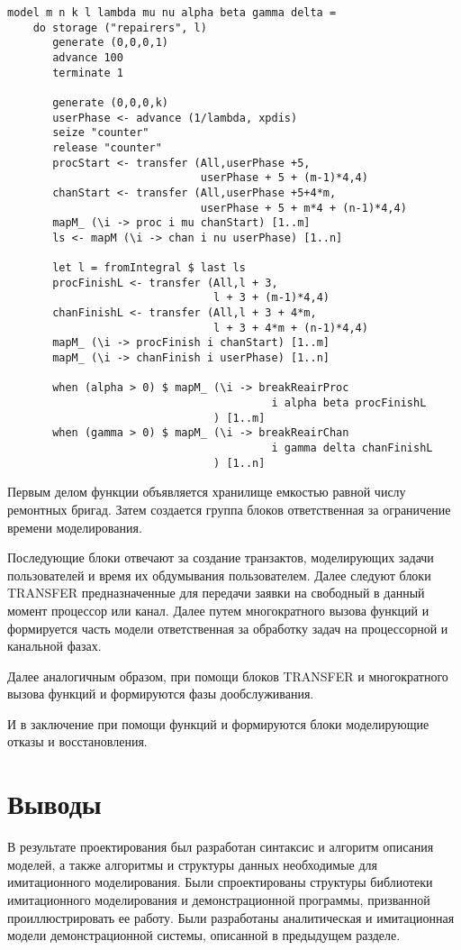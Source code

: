 \begin{verbatim}
model m n k l lambda mu nu alpha beta gamma delta = 
    do storage ("repairers", l)
       generate (0,0,0,1)
       advance 100
       terminate 1
       
       generate (0,0,0,k)
       userPhase <- advance (1/lambda, xpdis)
       seize "counter"
       release "counter"
       procStart <- transfer (All,userPhase +5, 
                              userPhase + 5 + (m-1)*4,4)
       chanStart <- transfer (All,userPhase +5+4*m, 
                              userPhase + 5 + m*4 + (n-1)*4,4)
       mapM_ (\i -> proc i mu chanStart) [1..m]
       ls <- mapM (\i -> chan i nu userPhase) [1..n]
       
       let l = fromIntegral $ last ls
       procFinishL <- transfer (All,l + 3,
                                l + 3 + (m-1)*4,4)
       chanFinishL <- transfer (All,l + 3 + 4*m,
                                l + 3 + 4*m + (n-1)*4,4)
       mapM_ (\i -> procFinish i chanStart) [1..m]
       mapM_ (\i -> chanFinish i userPhase) [1..n]
       
       when (alpha > 0) $ mapM_ (\i -> breakReairProc 
                                         i alpha beta procFinishL
                                ) [1..m]
       when (gamma > 0) $ mapM_ (\i -> breakReairChan 
                                         i gamma delta chanFinishL
                                ) [1..n]
\end{verbatim}

 Первым делом функции объявляется хранилище емкостью равной числу ремонтных бригад. Затем создается группа блоков ответственная за ограничение времени моделирования.

Последующие блоки отвечают за создание транзактов, моделирующих задачи пользователей и время их обдумывания пользователем. Далее следуют блоки TRANSFER предназначенные для передачи заявки на свободный в данный момент процессор или канал. Далее путем многократного вызова функций  и  формируется часть модели ответственная за обработку задач на процессорной и канальной фазах. 

Далее аналогичным образом, при помощи блоков TRANSFER и многократного вызова функций  и  формируются фазы дообслуживания. 

И в заключение при помощи функций  и  формируются блоки моделирующие отказы и восстановления.

\section{Выводы}

В результате проектирования был разработан синтаксис и алгоритм описания моделей, а также алгоритмы и структуры данных необходимые для имитационного моделирования. Были спроектированы структуры библиотеки имитационного моделирования и демонстрационной программы, призванной проиллюстрировать ее работу. Были разработаны аналитическая и имитационная модели демонстрационной системы, описанной в предыдущем разделе.
